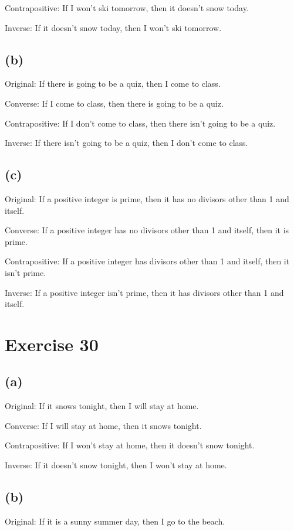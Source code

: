 \documentclass{article}
\begin{document}
Contrapositive: If I won't ski tomorrow, then it doesn't snow today.

Inverse: If it doesn't snow today, then I won't ski tomorrow.

\subsection{(b)}
Original: If there is going to be a quiz, then I come to class.

Converse: If I come to class, then there is going to be a quiz.

Contrapositive: If I don't come to class, then there isn't going to be a quiz.

Inverse: If there isn't going to be a quiz, then I don't come to class.

\subsection{(c)}
Original: If a positive integer is prime, then it has no divisors other than 1 and itself.

Converse: If a positive integer has no divisors other than 1 and itself, then it is prime.

Contrapositive: If a positive integer has divisors other than 1 and itself, then it isn't prime.

Inverse: If a positive integer isn't prime, then it has divisors other than 1 and itself.

\pagebreak

\section{Exercise 30}

\subsection{(a)}
Original: If it snows tonight, then I will stay at home.

Converse: If I will stay at home, then it snows tonight.

Contrapositive: If I won't stay at home, then it doesn't snow tonight.

Inverse: If it doesn't snow tonight, then I won't stay at home.

\subsection{(b)}
Original: If it is a sunny summer day, then I go to the beach.
\end{document}
